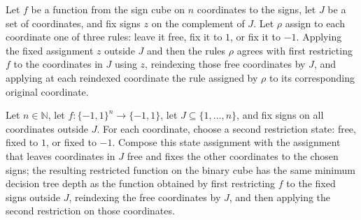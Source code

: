 \begin{theorem}
\label{FABL.restrict_compose_coordRestrictionOf}
\leanok
{}
Let $f$ be a function from the sign cube on $n$ coordinates to the signs, let $J$ be a
set of coordinates, and fix signs $z$ on the complement of $J$. Let $\rho$ assign to
each coordinate one of three rules: leave it free, fix it to $1$, or fix it to $-1$.
Applying the fixed assignment $z$ outside $J$ and then the rules $\rho$ agrees with
first restricting $f$ to the coordinates in $J$ using $z$, reindexing those free
coordinates by $J$, and applying at each reindexed coordinate the rule assigned by
$\rho$ to its corresponding original coordinate.
\end{theorem}

\begin{theorem}
\label{FABL.decisionTreeDepth_restrict_compose_coordRestrictionOf}
\leanok
{}
Let $n\in\mathbb{N}$, let $f:\{−1,1\}^n\to\{−1,1\}$, let $J\subseteq\{1,\ldots,n\}$, and
fix signs on all coordinates outside $J$. For each coordinate, choose a second
restriction state: free, fixed to $1$, or fixed to $-1$. Compose this state assignment
with the assignment that leaves coordinates in $J$ free and fixes the other coordinates
to the chosen signs; the resulting restricted function on the binary cube has the same
minimum decision tree depth as the function obtained by first restricting $f$ to the
fixed signs outside $J$, reindexing the free coordinates by $J$, and then applying the
second restriction on those coordinates.
\end{theorem}

